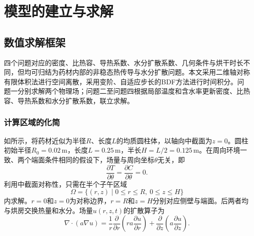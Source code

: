 \section{模型的建立与求解}
\begingroup
\setlength{\abovedisplayskip}{6pt plus 1pt minus 1pt}
\setlength{\belowdisplayskip}{6pt plus 1pt minus 1pt}
\setlength{\abovedisplayshortskip}{3pt}
\setlength{\belowdisplayshortskip}{4pt}
\setlength{\jot}{2pt}
\setlength{\intextsep}{9pt plus 2pt minus 2pt}
\setlength{\textfloatsep}{11pt plus 2pt minus 2pt}
\setlength{\floatsep}{8pt plus 2pt minus 2pt}
\subsection{数值求解框架}
四个问题对应的密度、比热容、导热系数、水分扩散系数、几何条件与烘干时长不同，但均可归结为药材内部的非稳态热传导与水分扩散问题。本文采用二维轴对称有限体积法进行空间离散，采用变阶、自适应步长的BDF方法进行时间积分。问题一分别求解两个物理场；问题二至问题四根据局部温度和含水率更新密度、比热容、导热系数和水分扩散系数，联立求解。

\subsubsection{计算区域的化简}
如所示，将药材近似为半径$R$、长度$L$的均质圆柱体，以轴向中截面为$z=0$。圆柱初始半径$R_0=0.02\,\mathrm{m}$，长度$L=0.25\,\mathrm{m}$，半长$H=L/2=0.125\,\mathrm{m}$。在周向环境一致、两个端面条件相同的假设下，场量与周向坐标$\theta$无关，即
\begin{equation}
\frac{\partial T}{\partial\theta}=\frac{\partial C}{\partial\theta}=0.
\end{equation}
\noindent 利用中截面对称性，只需在半个子午区域
\begin{equation}\label{eq:domain}
\Omega=\{(r,z)\mid 0\le r\le R,\ 0\le z\le H\}
\end{equation}
\noindent 内求解。$r=0$和$z=0$为对称边界，$r=R$和$z=H$分别对应侧壁与端面。后两者均与烘房交换热量和水分。场量$u(r,z,t)$的扩散算子为
\begin{equation}\label{eq:operator}
\nabla\cdot(a\nabla u)=
\frac1r\frac{\partial}{\partial r}\left(ra\frac{\partial u}{\partial r}\right)
+\frac{\partial}{\partial z}\left(a\frac{\partial u}{\partial z}\right).
\end{equation}

